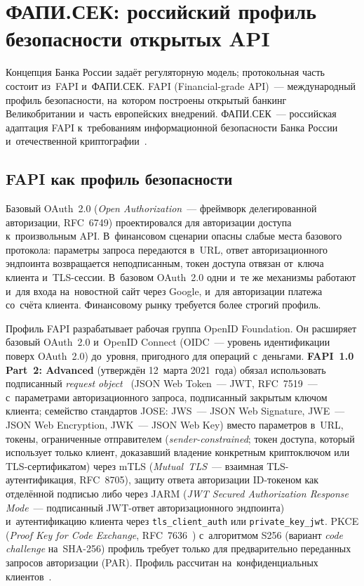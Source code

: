 \section{ФАПИ.СЕК: российский профиль безопасности открытых API}\label{sec:fapi-sec}

Концепция Банка России задаёт регуляторную модель; протокольная часть состоит
из~FAPI и~ФАПИ.СЕК. FAPI (Financial-grade API)~--- международный профиль
безопасности, на~котором построены открытый банкинг Великобритании и~часть
европейских внедрений. ФАПИ.СЕК~--- российская адаптация FAPI к~требованиям
информационной безопасности Банка России и~отечественной
криптографии~\cite{fapi-sec-2024}.

\subsection*{FAPI как профиль безопасности}

Базовый OAuth~2.0 (\textit{Open Authorization}~--- фреймворк делегированной
авторизации, RFC~6749) проектировался для авторизации доступа к~произвольным
API. В~финансовом сценарии опасны слабые места базового протокола: параметры запроса
передаются в~URL, ответ авторизационного эндпоинта возвращается неподписанным,
токен доступа отвязан от~ключа клиента и~TLS-сессии. В~базовом OAuth~2.0 одни и~те же механизмы работают и~для входа
на~новостной сайт через Google, и~для авторизации платежа со~счёта клиента.
Финансовому рынку требуется более строгий профиль.

Профиль FAPI разрабатывает рабочая группа OpenID Foundation. Он расширяет
базовый OAuth~2.0 и~OpenID Connect (OIDC~--- уровень идентификации поверх
OAuth~2.0) до~уровня, пригодного для операций с~деньгами. \textbf{FAPI~1.0
Part~2: Advanced} (утверждён 12~марта 2021~года) обязал использовать подписанный
\textit{request object}~\cite{rfc-9101-jar} (JSON Web Token~--- JWT,
  RFC~7519~--- с~параметрами авторизационного запроса, подписанный закрытым ключом
  клиента; семейство стандартов JOSE: JWS~--- JSON Web Signature, JWE~--- JSON Web
Encryption, JWK~--- JSON Web Key) вместо параметров в~URL,
токены, ограниченные отправителем (\textit{sender-constrained}; токен доступа,
  который использует только клиент, доказавший владение конкретным
криптоключом или TLS-сертификатом)
через mTLS (\textit{Mutual~TLS}~--- взаимная TLS-аутентификация, RFC~8705),
защиту ответа авторизации ID-токеном как отделённой подписью либо через JARM
(\textit{JWT Secured Authorization Response Mode}~--- подписанный JWT-ответ
авторизационного эндпоинта) и~аутентификацию клиента через
\texttt{tls\_client\_auth} или \texttt{private\_key\_jwt}. PKCE (\textit{Proof
Key for Code Exchange}, RFC~7636~\cite{rfc-7636-pkce}) с~алгоритмом S256
(вариант \textit{code challenge} на~SHA-256) профиль требует только
для предварительно переданных запросов авторизации (PAR). Профиль рассчитан на~конфиденциальных
клиентов~\cite{fapi-1-part2}.

